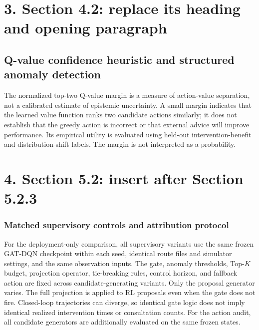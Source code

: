\documentclass[10pt]{article}
\begin{document}
\section*{3. Section 4.2: replace its heading and opening paragraph}
\subsection*{Q-value confidence heuristic and structured anomaly detection}
The normalized top-two Q-value margin is a measure of action-value separation,
not a calibrated estimate of epistemic uncertainty. A small margin indicates
that the learned value function ranks two candidate actions similarly; it does
not establish that the greedy action is incorrect or that external advice will
improve performance. Its empirical utility is evaluated using held-out intervention-benefit
and distribution-shift labels. The margin is not interpreted as a probability.

\section*{4. Section 5.2: insert after Section 5.2.3}
\subsubsection{Matched supervisory controls and attribution protocol}
For the deployment-only comparison, all supervisory variants use the same frozen
GAT-DQN checkpoint within each seed, identical route files and simulator settings,
and the same observation inputs. The gate, anomaly thresholds, Top-$K$ budget,
projection operator, tie-breaking rules, control horizon, and fallback action
are fixed across candidate-generating variants. Only the proposal generator varies.
The full projection is applied to RL proposals even when the gate does not fire.
Closed-loop trajectories can diverge, so identical gate logic does not imply
identical realized intervention times or consultation counts. For the action audit,
all candidate generators are additionally evaluated on the same frozen states.
\end{document}
